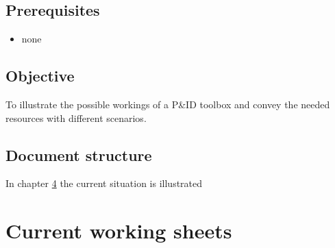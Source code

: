 \documentclass[11pt,fleqn,,a4paper,twoside,openright]{book}
\begin{document}
	\section{Prerequisites}\label{sec:Prerequisites}
	\begin{itemize}
		\item none
	\end{itemize}
	
	\section{Objective}\label{sec:Objective}
	To illustrate the possible workings of a P\&ID toolbox and convey the needed resources with different scenarios.
	
	\section{Document structure}\label{sec:Document structure}
	In chapter \ref{chap:Current working sheets} the current situation is illustrated
	
	\chapter{Current working sheets}\label{chap:Current working sheets}
	 
	
\end{document}
